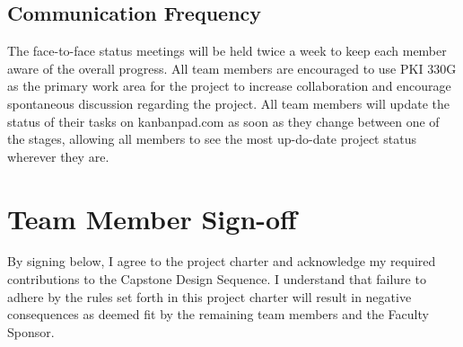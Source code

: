 \subsection{Communication Frequency}
The face-to-face status meetings will be held twice a week to keep each member aware of the overall progress.
All team members are encouraged to use PKI 330G as the primary work area for the project to increase collaboration and encourage spontaneous discussion regarding the project.
All team members will update the status of their tasks on kanbanpad.com as soon as they change between one of the stages, allowing all members to see the most up-do-date project status wherever they are.

\begin{minipage}{\textwidth}
\section{Team Member Sign-off}
By signing below, I agree to the project charter and acknowledge my required contributions to the Capstone Design Sequence. I understand that failure to adhere by the rules set forth in this project charter will result in negative consequences as deemed fit by the remaining team members and the Faculty Sponsor. 

\signatures
\end{minipage}
